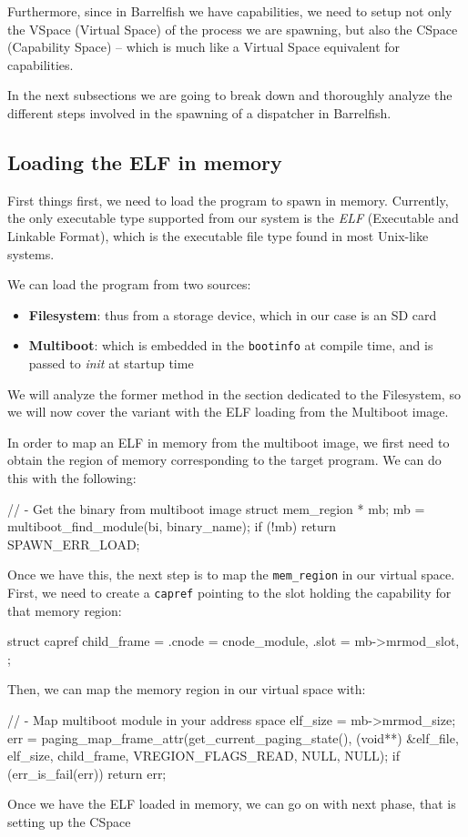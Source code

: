 \documentclass[a4paper,twoside,openright]{report}
\begin{document}
Furthermore, since in Barrelfish we have capabilities, we need to setup not only the VSpace (Virtual Space) of the process we are spawning, but also the CSpace (Capability Space) -- which is much like a Virtual Space equivalent for capabilities.

In the next subsections we are going to break down and thoroughly analyze the different steps involved in the spawning of a dispatcher in Barrelfish.

\subsection{Loading the ELF in memory}
First things first, we need to load the program to spawn in memory. Currently, the only executable type supported from our system is the \emph{ELF} (Executable and Linkable Format), which is the executable file type found in most Unix-like systems.

We can load the program from two sources:
\begin{itemize}
    \item \textbf{Filesystem}: thus from a storage device, which in our case is an SD card
    \item \textbf{Multiboot}: which is embedded in the \texttt{bootinfo} at compile time, and is passed to \emph{init} at startup time
\end{itemize}
We will analyze the former method in the section dedicated to the Filesystem, so we will now cover the variant with the ELF loading from the Multiboot image.

In order to map an ELF in memory from the multiboot image, we first need to obtain the region of memory corresponding to the target program. We can do this with the following:
\begin{pandacode}
    // - Get the binary from multiboot image
    struct mem_region * mb;
    mb = multiboot_find_module(bi, binary_name);
    if (!mb) {
        return SPAWN_ERR_LOAD;
    }
\end{pandacode}
Once we have this, the next step is to map the \texttt{mem\_region} in our virtual space.
First, we need to create a \texttt{capref} pointing to the slot holding the capability for that memory region:
\begin{pandacode}
    struct capref child_frame = {
        .cnode = cnode_module,
        .slot = mb->mrmod_slot,
    };
\end{pandacode}
Then, we can map the memory region in our virtual space with:
\begin{pandacode}
    // - Map multiboot module in your address space
    elf_size = mb->mrmod_size;
    err = paging_map_frame_attr(get_current_paging_state(),
    (void**) &elf_file, elf_size, child_frame,
    VREGION_FLAGS_READ, NULL, NULL);
    if (err_is_fail(err)) {
        return err;
    }
\end{pandacode}
Once we have the ELF loaded in memory, we can go on with next phase, that is setting up the CSpace
\end{document}
